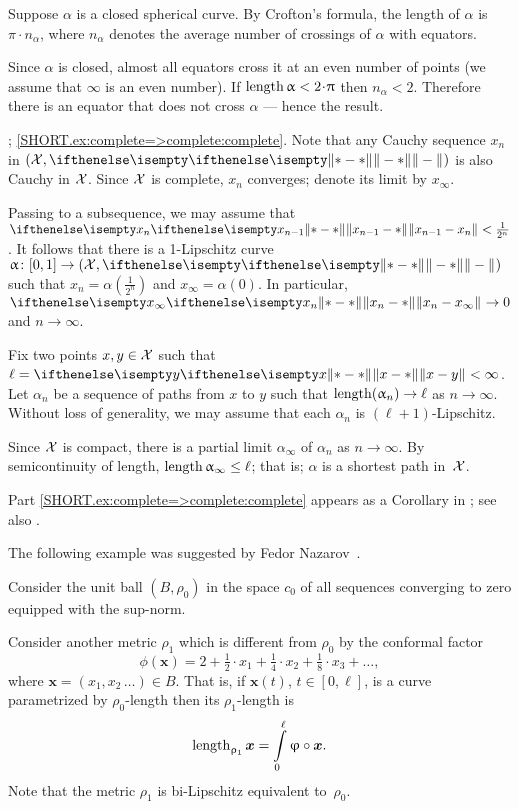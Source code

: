 Suppose $\alpha$ is a closed spherical curve. 
By Crofton's formula, the length of  $\alpha$  is $\pi\cdot n_\alpha$, where $n_\alpha$ denotes the average number of crossings of $\alpha$ with equators.

Since $\alpha$ is closed, almost all equators cross it at an even number of points (we assume that $\infty$ is an even number).
If $\length \alpha<2\cdot\pi$ then $n_\alpha<2$.
Therefore there is an equator that does not cross $\alpha$ --- hence the result.


\parbf{\ref{ex:complete=>complete}}; \ref{SHORT.ex:complete=>complete:complete}.
Note that any Cauchy sequence $x_n$ in $(\spc{X},\yetdist{}{}{})$ is also Cauchy in $\mathcal{X}$.
Since $\mathcal{X}$ is complete, $x_n$ converges; denote its limit by $x_\infty$.

Passing to a subsequence, we may assume that $\yetdist{x_{n-1}}{x_n}{}<\tfrac1{2^n}$.
It follows that there is a 1-Lipschitz curve $\alpha\:[0,1]\to (\spc{X},\yetdist{}{}{})$ such that $x_n=\alpha(\tfrac1{2^n})$ and $x_\infty=\alpha(0)$.
In particular, $\yetdist{x_n}{x_\infty}{}\to0$ and $n\to\infty$.

Fix two points $x,y\in\spc{X}$ such that $\ell=\yetdist{x}{y}{}<\infty$.
Let $\alpha_n$ be a sequence of paths from $x$ to $y$ such that $\length(\alpha_n)\to\ell$ as $n\to \infty$.
Without loss of generality, we may assume that each $\alpha_n$ is $(\ell+1)$-Lipschitz.

Since $\mathcal{X}$ is compact, there is a partial limit $\alpha_\infty$ of $\alpha_n$ as $n\to \infty$.
By semicontinuity of length, $\length\alpha_\infty\le\ell$;
that is; $\alpha$ is a shortest path in~$\mathcal{X}$.

 Part \ref{SHORT.ex:complete=>complete:complete} appears as a Corollary in \cite{hu-kirk}; see also \cite[Lemma 2.3]{petrunin-stadler}.

The following example was suggested by Fedor Nazarov~\cite{nazarov}.

\medskip

Consider the unit ball $(B,\rho_0)$
in the space $c_0$ of all sequences converging to zero equipped with the sup-norm.

Consider another metric $\rho_1$ which is different from $\rho_0$ by the conformal factor
\[\phi(\bm{x})=2+\tfrac{1}2\cdot x_1+\tfrac{1}4\cdot x_2+\tfrac{1}8\cdot x_3+\dots,\]
where $\bm{x}=(x_1,x_2\,\dots)\in B$.
That is, if $\bm{x}(t)$, $t\in[0,\ell]$, is a curve parametrized by $\rho_0$-length 
then its $\rho_1$-length is 
\[\length_{\rho_1}\bm{x}=\int\limits_0^\ell\phi\circ\bm{x}.\]
Note that the metric $\rho_1$ is bi-Lipschitz equivalent  to~$\rho_0$.

